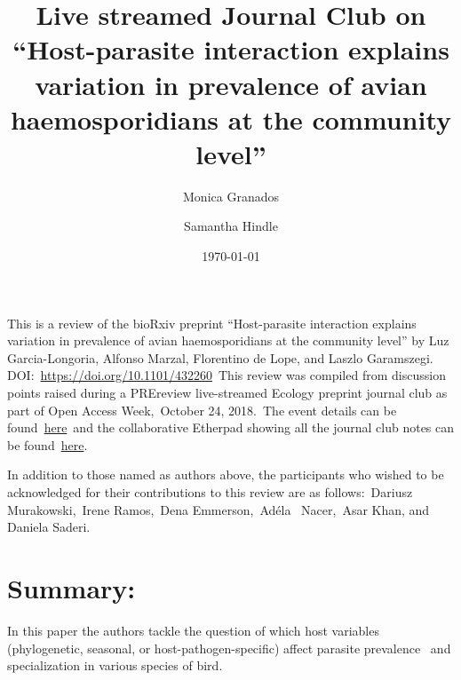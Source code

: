 \documentclass[10pt]{article}
\renewenvironment{abstract}
  {{\bfseries\noindent{\abstractname}\par\nobreak}\footnotesize}
  {\bigskip}
\begin{document}
\title{Live streamed Journal Club on ``Host-parasite interaction explains
variation in prevalence of avian haemosporidians at the community
level''}



\author[1]{Monica Granados}%
\author[1]{Samantha Hindle}%
%


\vspace{-1em}



  \date{\today}


\begingroup
\let\center\flushleft
\let\endcenter\endflushleft
\maketitle
\endgroup





\begin{abstract}
This is a review of the bioRxiv preprint ``Host-parasite interaction
explains variation in prevalence of avian haemosporidians at the
community level'' by Luz Garcia-Longoria, Alfonso Marzal, Florentino de
Lope, and Laszlo Garamszegi.
DOI:~\url{https://doi.org/10.1101/432260}~This review was compiled from
discussion points raised during a PREreview live-streamed Ecology
preprint journal club as part of Open Access Week,~October 24, 2018.~The
event details can be
found~\href{https://prereview.org/users/153686/articles/325778-prereview-plos-open-access-week-preprint-journal-club-information}{here}~and
the collaborative Etherpad showing all the journal club notes can be
found~\href{https://etherpad.net/p/EcologyLiveStreamedPREJC}{here}.~

\par\null

In addition to those named as authors above, the participants who wished
to be acknowledged for their contributions to this review are as
follows:~Dariusz Murakowski,~Irene Ramos,~Dena Emmerson,~Adéla~
Nacer,~Asar Khan, and Daniela Saderi.%
\end{abstract}%




\section*{Summary:~}

{\label{759186}}

In this paper the authors tackle the question of which host variables
(phylogenetic, seasonal, or host-pathogen-specific) affect parasite
prevalence~ and specialization in various species of bird.~~
\end{document}
